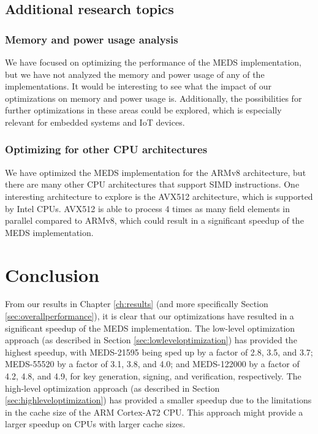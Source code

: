 \documentclass[11pt,a4paper]{report}
\theoremstyle{definition}
\begin{document}
\section{Additional research topics}
\label{sec:futureworkresearch}

\subsection*{Memory and power usage analysis}
We have focused on optimizing the performance of the MEDS implementation, but we have not analyzed the memory and power usage of any of the implementations. It would be interesting to see what the impact of our optimizations on memory and power usage is. Additionally, the possibilities for further optimizations in these areas could be explored, which is especially relevant for embedded systems and IoT devices.

\subsection*{Optimizing for other CPU architectures}
We have optimized the MEDS implementation for the ARMv8 architecture, but there are many other CPU architectures that support SIMD instructions. One interesting architecture to explore is the AVX512 architecture, which is supported by Intel CPUs. AVX512 is able to process 4 times as many field elements in parallel compared to ARMv8, which could result in a significant speedup of the MEDS implementation.

\chapter{Conclusion}
\label{ch:conclusion}
From our results in Chapter \ref{ch:results} (and more specifically Section \ref{sec:overallperformance}), it is clear that our optimizations have resulted in a significant speedup of the MEDS implementation. The low-level optimization approach (as described in Section \ref{sec:lowleveloptimization}) has provided the highest speedup, with MEDS-21595 being sped up by a factor of 2.8, 3.5, and 3.7; MEDS-55520 by a factor of 3.1, 3.8, and 4.0; and MEDS-122000 by a factor of 4.2, 4.8, and 4.9, for key generation, signing, and verification, respectively. The high-level optimization approach (as described in Section \ref{sec:highleveloptimization}) has provided a smaller speedup due to the limitations in the cache size of the ARM Cortex-A72 CPU. This approach might provide a larger speedup on CPUs with larger cache sizes.
\end{document}
